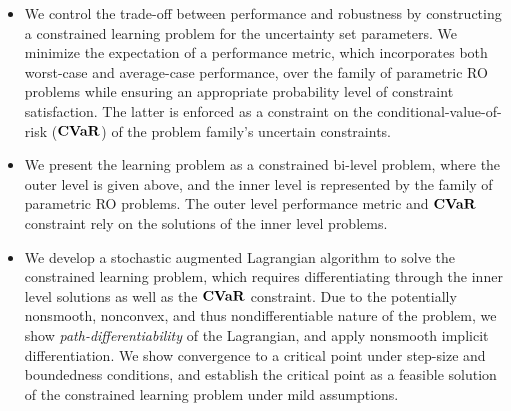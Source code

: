 \begin{itemize}
\item 
We control the trade-off between performance and robustness by constructing a constrained learning problem for the uncertainty set parameters. 
We minimize the expectation of a performance metric, which incorporates both worst-case and average-case performance, over the family of parametric \gls{RO} problems while ensuring an appropriate probability level of constraint satisfaction. The latter is enforced as a constraint on the conditional-value-of-risk ($\mathop{\bf CVaR}$) of the problem family's uncertain constraints.
\item We present the learning problem as a constrained bi-level problem, where the outer level is given above, and the inner level is represented by the family of parametric \gls{RO} problems. The outer level performance metric and $\mathop{\bf CVaR}$ constraint rely on the solutions of the inner level problems. 
 \item We develop a stochastic augmented Lagrangian algorithm to solve the constrained learning problem, which requires differentiating through the inner level solutions as well as the $\mathop{\bf CVaR}$ constraint. Due to the potentially nonsmooth, nonconvex, and thus nondifferentiable nature of the problem, we show {\it path-differentiability} of the Lagrangian, and apply nonsmooth implicit differentiation. We show convergence to a critical point under step-size and boundedness conditions, and establish the critical point as a feasible solution of the constrained learning problem under mild assumptions. 

\end{itemize}
